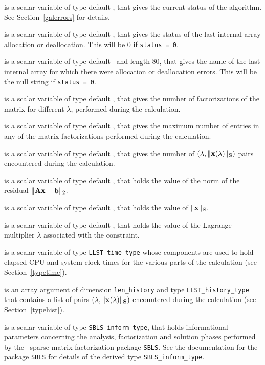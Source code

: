 \documentclass{galahad}
\newcommand{\packagename}{LLST}
\begin{document}
\begin{description}
 is a scalar variable of type default \integer, that gives the 
current status of the algorithm. See Section~\ref{galerrors} for details. 

 is a scalar variable of type default \integer, 
that gives the status of the last internal array allocation 
or deallocation. This will be 0 if {\tt status = 0}.

 is a scalar variable of type default \character\
and length 80, that  gives the name of the last internal array 
for which there were allocation or deallocation errors.
This will be the null string if {\tt status = 0}. 

 is a scalar variable of type default \integer, that 
gives the number of factorizations of the matrix \req{kkt}
for different $\lambda$, performed during the calculation.

 is a scalar variable of type default \integer, that 
gives the maximum number of entries in any of the matrix factorizations 
performed during the calculation.

 is a scalar variable of type default \integer, that gives 
the number of $(\lambda,\|{\mathbf{x}}(\lambda)\|_{{\mathbf{S}}})$ pairs encountered during the
calculation.

 is a scalar variable of type default \realdp, that holds the
value of the norm of the residual $\| {\mathbf{A}} {\mathbf{x}} - {\mathbf{b}}\|_2$.

 is a scalar variable of type default \realdp, 
that holds the value of $\|{\mathbf{x}}\|_{{\mathbf{S}}}$.
 
 is a scalar variable of type default \realdp, that holds the 
value of the Lagrange multiplier $\lambda$ associated with the constraint. 
 
 is a scalar variable of type {\tt \packagename\_time\_type} 
whose components are used to hold elapsed CPU  and system clock times for the 
various parts of the calculation (see Section~\ref{typetime}).

 is an array argument of dimension {\tt len\_history} and  
type {\tt \packagename\_history\_type} that contains a list of pairs
$(\lambda,\|{\mathbf{x}}(\lambda)\|_{{\mathbf{S}}})$ encountered during the
calculation (see Section~\ref{typehist}).

 is a scalar variable of type {\tt SBLS\_inform\_type}, 
that holds informational parameters concerning the analysis, factorization
and solution phases performed by 
the \galahad\ sparse matrix factorization package {\tt SBLS}. 
See the documentation for the package {\tt SBLS} for details of the
derived type {\tt SBLS\_inform\_type}.


\end{description}
\end{document}
